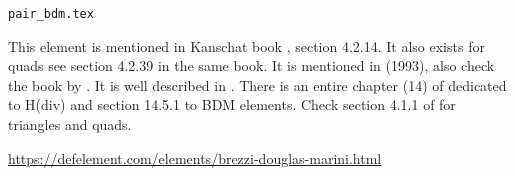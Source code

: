 \begin{flushright} {\tiny {\color{gray} \tt  pair\_bdm.tex}} \end{flushright}

This element is mentioned in Kanschat book \cite{kanschat}, section 4.2.14. 
It also exists for quads see section 4.2.39 in the same book.
It is mentioned in \textcite{chen93a} (1993), also check the book by \textcite{brfo}.
It is well described in \textcite{kanschat17}.
There is an entire chapter (14) of \textcite{ergu21_72} dedicated to H(div) and 
section 14.5.1 to BDM elements. 
Check section 4.1.1 of \cite{aubb17} for triangles and quads.

\begin{center}
\url{https://defelement.com/elements/brezzi-douglas-marini.html}
\end{center}
